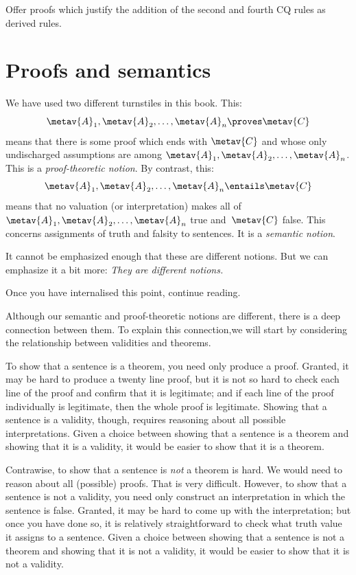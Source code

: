 \practiceproblems

\problempart
Offer proofs which justify the addition of the second and fourth CQ rules as derived rules.



\chapter{Proofs and semantics}
We have used two different turnstiles in this book.  This:
$$\metav{A}_1, \metav{A}_2, \ldots, \metav{A}_n \proves \metav{C}$$
means that there is some proof which ends with $\metav{C}$ and whose only undischarged assumptions are among $\metav{A}_1, \metav{A}_2, \ldots, \metav{A}_n$. This is a \emph{proof-theoretic notion}. By contrast, this: 
$$\metav{A}_1, \metav{A}_2, \ldots, \metav{A}_n \entails \metav{C}$$
means that no valuation (or interpretation) makes all of $\metav{A}_1, \metav{A}_2, \ldots, \metav{A}_n$ true and~$\metav{C}$ false. This concerns assignments of truth and falsity to sentences. It is a \emph{semantic notion}.

It cannot be emphasized enough that these are different notions. But we can emphasize it a bit more: \emph{They are different notions.}

Once you have internalised this point, continue reading.

Although our semantic and proof-theoretic notions are different, there is a deep connection between them. To explain this connection,we will start by considering the relationship between validities and theorems.

To show that a sentence is a theorem, you need only produce a proof. Granted, it may be hard to produce a twenty line proof, but it is not so hard to check each line of the proof and confirm that it is legitimate; and if each line of the proof individually is legitimate, then the whole proof is legitimate. Showing that a sentence is a validity, though, requires reasoning about all possible interpretations. Given a choice between showing that a sentence is a theorem and showing that it is a validity, it would be easier to show that it is a theorem.

Contrawise, to show that a sentence is \emph{not} a theorem is hard. We would need to reason about all (possible) proofs. That is very difficult. However, to show that a sentence is not a validity, you need only construct an interpretation in which the sentence is false. Granted, it may be hard to come up with the interpretation; but once you have done so, it is relatively straightforward to check what truth value it assigns to a sentence. Given a choice between showing that a sentence is not a theorem and showing that it is not a validity, it would be easier to show that it is not a validity.

